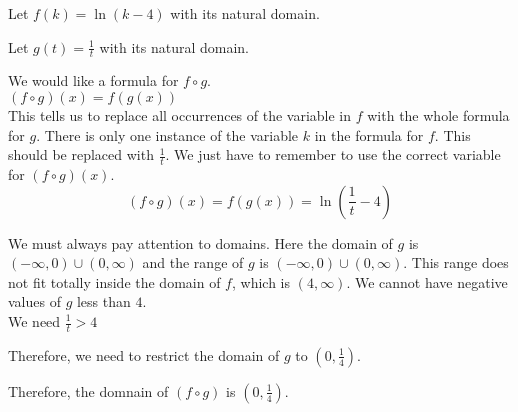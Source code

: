 \documentclass{ximera}
\begin{document}
\begin{example}


Let $f(k) = \ln(k - 4)$ with its natural domain.


Let $g(t) = \frac{1}{t}$ with its natural domain.



\begin{explanation}

We would like a formula for $f \circ g$. \\

$(f \circ g)(x) = f(g(x))$ \\

This tells us to replace all occurrences of the variable in $f$ with the whole formula for $g$.  There is only one instance of the variable $k$ in the formula for $f$.  This should be replaced with $\frac{1}{t}$. We just have to remember to use the correct variable for $(f \circ g)(x)$. \\



\[
(f \circ g)(x) = f(g(x)) = \ln\left( \frac{1}{t} - 4 \right)
\]




\end{explanation}


\begin{observation}


We must always pay attention to domains.  Here the domain of $g$ is $(-\infty, 0) \cup (0, \infty)$ and the range of $g$ is $(-\infty, 0) \cup (0, \infty)$.  This range does not fit totally inside the domain of $f$, which is $(4, \infty)$.  We cannot have negative values of $g$ less than $4$.  \\


We need $\frac{1}{t} > 4$

Therefore, we need to restrict the domain of $g$ to $\left(0, \frac{1}{4} \right)$.



Therefore, the domnain of $(f \circ g)$ is $\left(0, \frac{1}{4} \right)$.

\end{observation}


\end{example}
\end{document}
